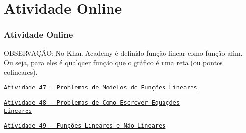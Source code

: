 \section{Atividade Online}
\begin{frame}
\frametitle{Atividade Online} 

OBSERVAÇÃO: No Khan Academy é definido função linear como função
afim. Ou seja, para eles é qualquer função que o gráfico é uma reta
(ou pontos colineares).

\href{https://pt.khanacademy.org/math/cc-eighth-grade-math/cc-8th-linear-equations-functions/8th-linear-functions-modeling/e/constructing-and-interpreting-linear-functions}
{{\tt Atividade 47 - Problemas de Modelos de Funções Lineares}}

\href{https://pt.khanacademy.org/math/cc-eighth-grade-math/cc-8th-linear-equations-functions/constructing-linear-models-real-world/e/constructing-linear-functions-word-problems}
{{\tt Atividade 48 - Problemas de Como Escrever Equações\\ Lineares}}

\href{https://pt.khanacademy.org/math/cc-eighth-grade-math/cc-8th-linear-equations-functions/linear-nonlinear-functions-tut/e/linear-non-linear-functions}
{{\tt Atividade 49 - Funções Lineares e Não Lineares}}


\end{frame}

